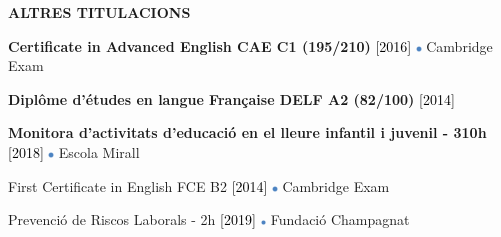 \documentclass[../main.tex]{subfiles}
\begin{document}
    \vspace*{0.5cm}
    \textbf{\textcolor{myCV2}{ALTRES TITULACIONS\underline{\hspace{5.2cm}}}}
        \vspace*{0.3cm}
        
        \textbf{Certificate in Advanced English CAE C1 (195/210)}
        \textcolor{black}{[2016]}
        \includegraphics[width=0.15cm]{assets/full.png} 
        Cambridge Exam
        
        \vspace*{0.25cm}
        \textbf{Diplôme d'études en langue Française DELF A2 (82/100)} 
        \textcolor{black}{[2014]}
        
        \vspace*{0.25cm}
        \textbf{Monitora d'activitats d'educació en el lleure infantil i juvenil - 310h}
        \textcolor{black}{[2018]}
        \includegraphics[width=0.15cm]{assets/full.png} 
        Escola Mirall
        
        \vspace*{0.25cm}
        First Certificate in English FCE B2
        \textcolor{black}{[2014]}
        \includegraphics[width=0.15cm]{assets/full.png} 
        Cambridge Exam 

        \vspace*{0.25cm}
        Prevenció de Riscos Laborals - 2h
        \textcolor{black}{[2019]}
        \includegraphics[width=0.15cm]{assets/full.png}
        Fundació Champagnat

\end{document}
